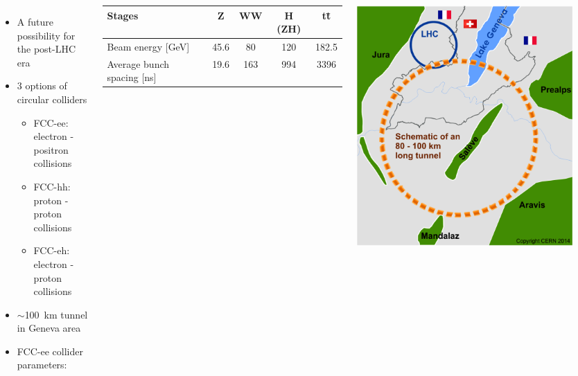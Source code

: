 \documentclass[final,xcolor={dvipsnames,svgnames,x11names,table}]{beamer}
\begin{document}
\begin{frame}
\begin{textblock}{43}
\begin{tcolorbox}[title=The Future Circular Collider Experiment (FCC)]
  \begin{columns}
      \begin{itemize}
        \item A future possibility for the post-LHC era \vspace{0.2cm}
        \item 3 options of circular colliders \vspace{0.2cm}
          \begin{itemize}
            \item FCC-ee: electron - positron collisions
            \item FCC-hh: proton - proton collisions
            \item FCC-eh: electron - proton collisions
          \end{itemize}
        \item $\sim$100~km tunnel in Geneva area \vspace{0.2cm}
        \item FCC-ee collider parameters: \vspace{0.2cm}
      \end{itemize}
        \centering
      	\begin{tabular}{| l | c | c | c | c |}
        	\toprule
      	   Stages & Z & WW & H (ZH) & t\={t} \\
      	   \midrule
           Beam energy [GeV] & 45.6 & 80 & 120 & 182.5 \\
           Average bunch spacing [ns] & 19.6 & 163 & 994 & 3396\\
      	   \bottomrule
      	\end{tabular}

      \centering
      \includegraphics[width=0.9\textwidth]{Figures/cernFCC}
  \end{columns}


\end{tcolorbox}
\end{textblock}
\end{frame}
\end{document}
